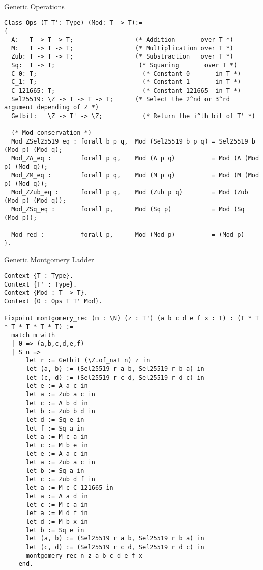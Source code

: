 \documentclass[8pt]{beamer}
\begin{document}
\begin{frame}[fragile]{Generic Operations}
\begin{center}

\begin{lstlisting}[language=Coq]
Class Ops (T T': Type) (Mod: T -> T):=
{
  A:   T -> T -> T;                 (* Addition       over T *)
  M:   T -> T -> T;                 (* Multiplication over T *)
  Zub: T -> T -> T;                 (* Substraction   over T *)
  Sq:  T -> T;                       (* Squaring       over T *)
  C_0: T;                             (* Constant 0       in T *)
  C_1: T;                             (* Constant 1       in T *)
  C_121665: T;                        (* Constant 121665  in T *)
  Sel25519: \Z -> T -> T -> T;      (* Select the 2^nd or 3^rd argument depending of Z *)
  Getbit:   \Z -> T' -> \Z;           (* Return the i^th bit of T' *)

  (* Mod conservation *)
  Mod_ZSel25519_eq : forall b p q,  Mod (Sel25519 b p q) = Sel25519 b (Mod p) (Mod q);
  Mod_ZA_eq :        forall p q,    Mod (A p q)          = Mod (A (Mod p) (Mod q));
  Mod_ZM_eq :        forall p q,    Mod (M p q)          = Mod (M (Mod p) (Mod q));
  Mod_ZZub_eq :      forall p q,    Mod (Zub p q)        = Mod (Zub (Mod p) (Mod q));
  Mod_ZSq_eq :       forall p,      Mod (Sq p)           = Mod (Sq (Mod p));

  Mod_red :          forall p,      Mod (Mod p)          = (Mod p)
}.
\end{lstlisting}
\end{center}
\end{frame}

\begin{frame}[fragile]{Generic Montgomery Ladder}
\begin{center}
\begin{lstlisting}[language=Coq]
Context {T : Type}.
Context {T' : Type}.
Context {Mod : T -> T}.
Context {O : Ops T T' Mod}.

Fixpoint montgomery_rec (m : \N) (z : T') (a b c d e f x : T) : (T * T * T * T * T * T) :=
  match m with
  | 0 => (a,b,c,d,e,f)
  | S n =>
      let r := Getbit (\Z.of_nat n) z in
      let (a, b) := (Sel25519 r a b, Sel25519 r b a) in
      let (c, d) := (Sel25519 r c d, Sel25519 r d c) in
      let e := A a c in
      let a := Zub a c in
      let c := A b d in
      let b := Zub b d in
      let d := Sq e in
      let f := Sq a in
      let a := M c a in
      let c := M b e in
      let e := A a c in
      let a := Zub a c in
      let b := Sq a in
      let c := Zub d f in
      let a := M c C_121665 in
      let a := A a d in
      let c := M c a in
      let a := M d f in
      let d := M b x in
      let b := Sq e in
      let (a, b) := (Sel25519 r a b, Sel25519 r b a) in
      let (c, d) := (Sel25519 r c d, Sel25519 r d c) in
      montgomery_rec n z a b c d e f x
    end.
\end{lstlisting}
\end{center}
\end{frame}
\end{document}
